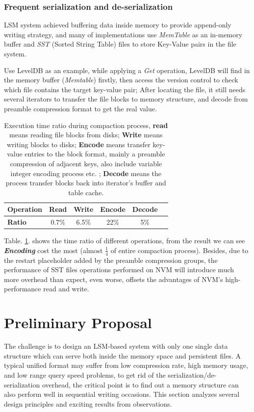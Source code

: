 \subsubsection{Frequent serialization and de-serialization}
LSM system achieved buffering data inside memory to provide append-only writing strategy, and many of implementations use \textit{MemTable} as an in-memory buffer and \textit{SST} (Sorted String Table) files to store Key-Value pairs in the file system. 

Use LevelDB\cite{LevelDBo44:online} as an example, while applying a \textit{Get} operation, LevelDB will find in the memory buffer (\textit{Memtable}) firstly, then access the version control to check which file contains the target key-value pair; After locating the file, it still needs several iterators to transfer the file blocks to memory structure, and decode from preamble compression format to get the real value.
 
\begin{table}[t]
	\centering
	\begin{tabular}{|l|c|c|c|c|c|}
		\hline
		\textbf{Operation} & Read & Write & Encode & Decode  \\ \hline
		\textbf{Ratio} & 0.7\% & 6.5\% & 22\% & 5\%  \\ \hline
	\end{tabular}
	\caption{Execution time ratio during compaction process, \textbf{read} means reading file blocks from disks; \textbf{Write} means writing blocks to disks; \textbf{Encode} means transfer key-value entries to the block format, mainly a 
		preamble compression of adjacent keys, also include variable integer encoding process etc. ; \textbf{Decode} means the process transfer blocks back into iterator's buffer and table cache.}
	\label{tab:file_read_ratio}
\end{table}

Table. \ref{tab:file_read_ratio}. shows the time ratio of different operations, from the result we can see \textbf{\textit{Encoding}} cost the most (almost $\frac{1}{4}$ of entire compaction process). Besides, due to the restart placeholder added by the preamble compression groups, the performance of SST files operations performed on NVM will introduce much more overhead than expect, even worse, offsets the advantages of NVM's high-performance read and write.

\section{Preliminary Proposal}
The challenge is to design an LSM-based system with only one single data structure which can serve both inside the memory space and persistent files. A typical unified format may suffer from low compression rate, high memory usage, and low range query speed problems, to get rid of the serialization/de-serialization overhead, the critical point is to find out a memory structure can also perform well in sequential writing occasions. This section analyzes several design principles and exciting results from observations.

